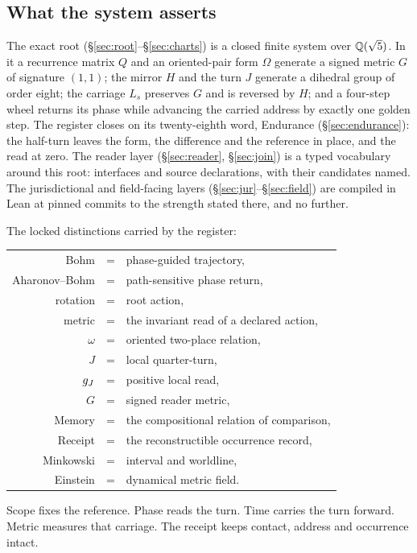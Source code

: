 \documentclass[11pt,a4paper]{article}
\theoremstyle{plain}
\theoremstyle{definition}
\theoremstyle{remark}
\begin{document}
\subsection{What the system asserts}
The exact root (\S\ref{sec:root}--\S\ref{sec:charts}) is a closed finite system over $\mathbb{Q}(\sqrt5)$. In it a recurrence matrix $Q$ and an oriented-pair form $\Omega$ generate a signed metric $G$ of signature $(1,1)$; the mirror $H$ and the turn $J$ generate a dihedral group of order eight; the carriage $L_s$ preserves $G$ and is reversed by $H$; and a four-step wheel returns its phase while advancing the carried address by exactly one golden step. The register closes on its twenty-eighth word, Endurance (\S\ref{sec:endurance}): the half-turn leaves the form, the difference and the reference in place, and the read at zero. The reader layer (\S\ref{sec:reader}, \S\ref{sec:join}) is a typed vocabulary around this root: interfaces and source declarations, with their candidates named. The jurisdictional and field-facing layers (\S\ref{sec:jur}--\S\ref{sec:field}) are compiled in Lean at pinned commits to the strength stated there, and no further.

The locked distinctions carried by the register:
\begin{center}
\begin{tabular}{@{}rcl@{}}
Bohm & = & phase-guided trajectory,\\
Aharonov--Bohm & = & path-sensitive phase return,\\
rotation & = & root action,\\
metric & = & the invariant read of a declared action,\\
$\omega$ & = & oriented two-place relation,\\
$J$ & = & local quarter-turn,\\
$g_J$ & = & positive local read,\\
$G$ & = & signed reader metric,\\
Memory & = & the compositional relation of comparison,\\
Receipt & = & the reconstructible occurrence record,\\
Minkowski & = & interval and worldline,\\
Einstein & = & dynamical metric field.
\end{tabular}
\end{center}
Scope fixes the reference. Phase reads the turn. Time carries the turn forward. Metric measures that carriage. The receipt keeps contact, address and occurrence intact.
\end{document}
